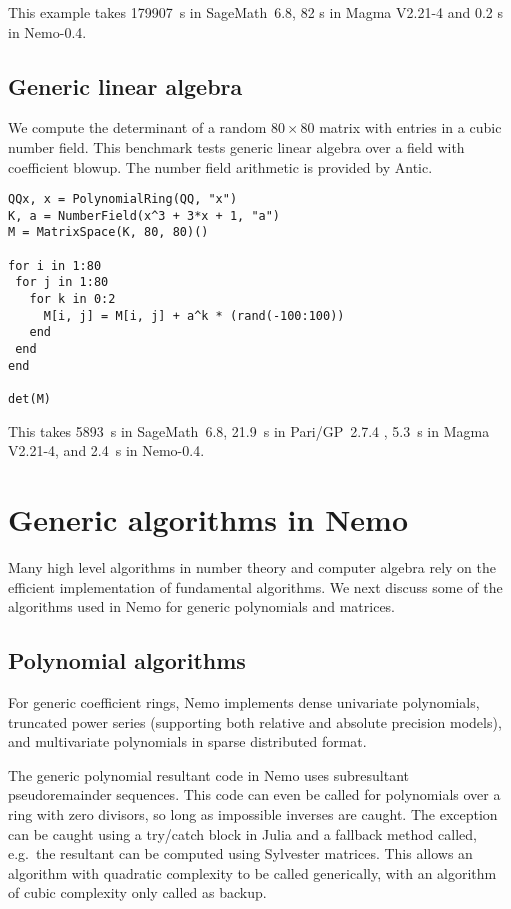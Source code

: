 \documentclass{sig-alternate-05-2015}
\begin{document}
This example takes 179907~s in SageMath~6.8, 82 s in Magma V2.21-4
and 0.2 s in Nemo-0.4.

\subsection{Generic linear algebra}

We compute the determinant of a random $80\times80$ matrix
with entries in a cubic number field.
This benchmark tests generic linear algebra over a field
with coefficient blowup. The number field arithmetic is
provided by Antic.

\begin{small}
\begin{verbatim}
QQx, x = PolynomialRing(QQ, "x")
K, a = NumberField(x^3 + 3*x + 1, "a")
M = MatrixSpace(K, 80, 80)()

for i in 1:80
 for j in 1:80
   for k in 0:2
     M[i, j] = M[i, j] + a^k * (rand(-100:100))
   end
 end
end

det(M)
\end{verbatim}
\end{small}

This takes 5893~s in SageMath~6.8, 21.9~s in Pari/GP~2.7.4 \cite{pari}, 5.3~s in Magma V2.21-4,
and 2.4~s in Nemo-0.4.

\section{Generic algorithms in Nemo}
\label{sect:generic}

Many high level algorithms in number theory and computer algebra rely on
the efficient implementation of fundamental algorithms.
We next discuss some of the algorithms
used in Nemo for generic polynomials and matrices.

\subsection{Polynomial algorithms}

For generic coefficient rings, Nemo implements dense univariate polynomials,
truncated power series (supporting both relative and absolute precision models),
and multivariate polynomials in sparse distributed format.

The generic polynomial resultant code in Nemo uses subresultant
pseudoremainder sequences. This code can even be called for polynomials over a
ring with zero divisors, so long as impossible inverses are caught. The exception
can be caught using a try/catch block in Julia and a fallback method called, e.g.\
the resultant can be computed using Sylvester matrices. This allows an algorithm
with quadratic complexity to be called generically, with an algorithm of cubic
complexity only called as backup.
\end{document}
